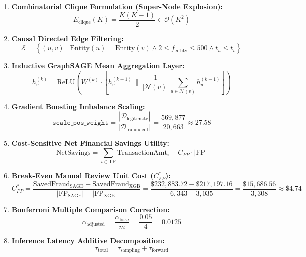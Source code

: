 \documentclass[11pt,a4paper]{report}
\begin{document}
\begin{enumerate}
    \item \textbf{Combinatorial Clique Formulation (Super-Node Explosion):}
    \begin{equation}
    E_{\text{clique}}(K) = \frac{K(K-1)}{2} \in \mathcal{O}(K^2)
    \end{equation}
    \item \textbf{Causal Directed Edge Filtering:}
    \begin{equation}
    \mathcal{E} = \left\{ (u, v) \mid \text{Entity}(u) = \text{Entity}(v) \land 2 \leq f_{\text{entity}} \leq 500 \land t_u \leq t_v \right\}
    \end{equation}
    \item \textbf{Inductive GraphSAGE Mean Aggregation Layer:}
    \begin{equation}
    h_v^{(k)} = \text{ReLU} \left( W^{(k)} \cdot \left[ h_v^{(k-1)} \,\|\, \frac{1}{|\mathcal{N}(v)|} \sum_{u \in \mathcal{N}(v)} h_u^{(k-1)} \right] \right)
    \end{equation}
    \item \textbf{Gradient Boosting Imbalance Scaling:}
    \begin{equation}
    \texttt{scale\_pos\_weight} = \frac{|\mathcal{D}_{\text{legitimate}}|}{|\mathcal{D}_{\text{fraudulent}}|} = \frac{569{,}877}{20{,}663} \approx 27.58
    \end{equation}
    \item \textbf{Cost-Sensitive Net Financial Savings Utility:}
    \begin{equation}
    \text{NetSavings} = \sum_{i \in \text{TP}} \text{TransactionAmt}_i - C_{FP} \cdot |\text{FP}|
    \end{equation}
    \item \textbf{Break-Even Manual Review Unit Cost ($C_{FP}^*$):}
    \begin{equation}
    C_{FP}^* = \frac{\text{SavedFraud}_{\text{SAGE}} - \text{SavedFraud}_{\text{XGB}}}{|\text{FP}_{\text{SAGE}}| - |\text{FP}_{\text{XGB}}|} = \frac{\$232{,}883.72 - \$217{,}197.16}{6{,}343 - 3{,}035} = \frac{\$15{,}686.56}{3{,}308} \approx \$4.74
    \end{equation}
    \item \textbf{Bonferroni Multiple Comparison Correction:}
    \begin{equation}
    \alpha_{\text{adjusted}} = \frac{\alpha_{\text{base}}}{m} = \frac{0.05}{4} = 0.0125
    \end{equation}
    \item \textbf{Inference Latency Additive Decomposition:}
    \begin{equation}
    \tau_{\text{total}} = \tau_{\text{sampling}} + \tau_{\text{forward}}
    \end{equation}
\end{enumerate}
\end{document}
